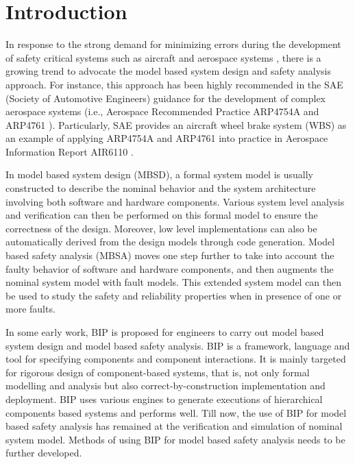 
\section{Introduction}

In response to the strong demand for minimizing errors during the development of safety critical systems such as aircraft and aerospace systems \cite{lctes10,issrew12},
  there is a growing trend to advocate the model based system design and safety analysis approach.
  For instance, this approach has been highly recommended in the SAE (Society of Automotive Engineers) guidance for the development of complex aerospace systems 
  (i.e., Aerospace Recommended Practice ARP4754A \cite{arp4754a} and ARP4761 \cite{arp4761}).
  Particularly, SAE provides an aircraft wheel brake system (WBS) as an example of applying ARP4754A and ARP4761 into practice 
  in Aerospace Information Report AIR6110 \cite{air6110}.

 In model based system design (MBSD),
 a formal system model is usually constructed to describe the nominal behavior and the system architecture involving both software and hardware components.
 Various system level analysis and verification can then be performed on this formal model to ensure the correctness of the design.
 Moreover, low level implementations can also be automatically derived from the design models through code generation.
 Model based safety analysis (MBSA) moves one step further to take into account the faulty behavior of software and hardware components,
 and then augments the nominal system model with fault models.
 This extended system model can then be used to study the safety and reliability properties when in presence of one or more faults.

In some early work\cite{bip1,bip2}, BIP is proposed for engineers to carry out model based system design and model based safety analysis.
BIP is a framework, language and tool for specifying components and component interactions.
It is mainly targeted for rigorous design of component-based systems, that is, not only formal modelling and analysis but also correct-by-construction implementation and deployment.
BIP uses various engines to generate executions of hierarchical components based systems and performs well.
Till now, the use of BIP for model based safety analysis has remained at the verification and simulation of nominal system model.
Methods of using BIP for model based safety analysis needs to be further developed.

\begin{comment}
BIP also provides a type definition for each component and graphical representation for BIP model to decrease the complexity of system design.
\end{comment}

